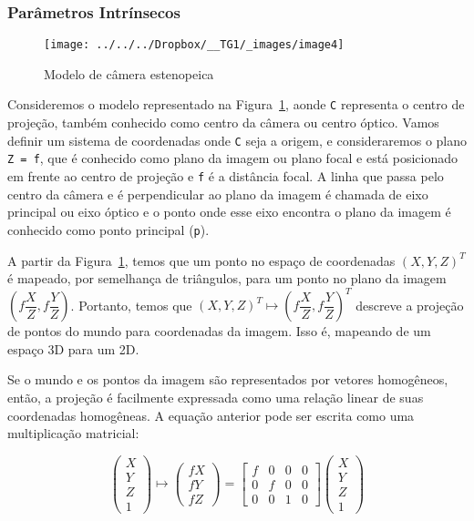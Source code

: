 \documentclass[ecp,tc]{iiufrgs}
\begin{document}
\subsubsection{Parâmetros Intrínsecos}

\begin{figure}
	\centering
	\caption{Modelo de câmera estenopeica}
	\texttt{[image: ../../../Dropbox/\_\_TG1/\_images/image4]}
	\label{fig:image4}
\end{figure}

Consideremos o modelo representado na Figura~\ref{fig:image4}, aonde \texttt{C} representa o centro de projeção, também conhecido como centro da câmera ou centro óptico. Vamos definir um sistema de coordenadas onde \texttt{C} seja a origem, e consideraremos o plano \texttt{Z = f}, que é conhecido como plano da imagem ou plano focal e está posicionado em frente ao centro de projeção e \texttt{f} é a distância focal. A linha que passa pelo centro da câmera e é perpendicular ao plano da imagem é chamada de eixo principal ou eixo óptico e o ponto onde esse eixo encontra o plano da imagem é conhecido como ponto principal (\texttt{p}).

A partir da Figura~\ref{fig:image4}, temos que um ponto no espaço de coordenadas $(X, Y, Z)^T$ é mapeado, por semelhança de triângulos, para um ponto no plano da imagem $ (f\dfrac{X}{Z}, f\dfrac{Y}{Z}) $. Portanto, temos que $ (X, Y, Z)^T \mapsto (f\dfrac{X}{Z}, f\dfrac{Y}{Z})^T $ descreve  a  projeção  de  pontos  do  mundo  para  coordenadas  da  imagem.  Isso  é, mapeando de um espaço 3D para um 2D.

Se o mundo e os pontos da imagem são representados por vetores homogêneos, então, a projeção é facilmente expressada como uma relação linear de suas coordenadas homogêneas. A equação anterior pode ser escrita como uma multiplicação matricial:

\[\begin{pmatrix} X \\ Y \\ Z \\ 1 \end{pmatrix} \mapsto \begin{pmatrix} fX \\ fY \\ fZ \end{pmatrix} = \begin{bmatrix} f & 0 & 0 & 0 \\ 0 & f & 0 & 0 \\ 0 & 0 & 1 & 0 \end{bmatrix} \begin{pmatrix} X \\ Y \\ Z \\ 1 \end{pmatrix} \]
\end{document}
